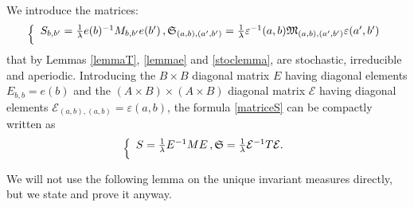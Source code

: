 \documentclass[reqno]{amsart}
\theoremstyle{plain}
\theoremstyle{definition}
\theoremstyle{remark}
\numberwithin{equation}{section}
\numberwithin{theorem}{section}
\def\\{\par\medskip}
\newcommand{\<}{\langle}
\renewcommand{\>}{\rangle}
\begin{document}
	We introduce the matrices:
	\begin{equation}\label {matriceS}
		\left\{
		\begin{array}{l}
			S_{b,b'}= \frac{1}{\lambda} e(b)^{-1} M_{b,b'}e(b')\,, \\
			\mathfrak S_{(a,b),(a',b')}=\frac 1\lambda \varepsilon^{-1}(a,b)\mathfrak M_{(a,b),(a',b')}\varepsilon(a',b')
		\end{array}
		\right.
	\end{equation}
	that by Lemmas \ref{lemmaT}, \ref{lemmae} and \ref{stoclemma}, are stochastic, irreducible and aperiodic.
	Introducing the $B\times B$ diagonal matrix $E$ having diagonal elements $ E_{b,b}=e(b)$ and the  $(A\times B)\times (A\times B)$ diagonal matrix $\mathcal E$ having diagonal elements $\mathcal E_{(a,b),(a,b)}=\varepsilon(a,b)$, the formula \eqref{matriceS} can be compactly written as 
	\begin{equation}\label{matriceScompact}
		\left\{
		\begin{array}{l}
			S=\frac 1\lambda E^{-1}M E\,, \\
			\mathfrak S=\frac 1\lambda \mathcal E^{-1}T\mathcal E.
		\end{array}
		\right.
	\end{equation}
	
	
	We will not use the following lemma on the unique invariant measures directly, but we state and prove it anyway.
	
	
	
\end{document}
